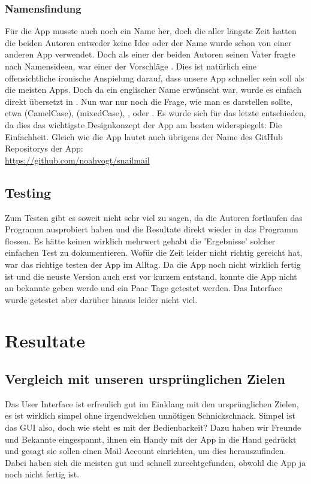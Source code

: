 \documentclass[a4paper,11pt]{article}
\begin{document}
\subsubsection{Namensfindung}
Für die App musste auch noch ein Name her, doch die aller längste Zeit hatten die beiden Autoren entweder keine Idee oder der Name wurde schon von einer anderen App verwendet. Doch als einer der beiden Autoren seinen Vater fragte nach Namensideen, war einer der Vorschläge . Dies ist natürlich eine offensichtliche ironische Anspielung darauf, dass unsere App schneller sein soll als die meisten Apps. Doch da ein englischer Name erwünscht war, wurde es einfach direkt übersetzt in . Nun war nur noch die Frage, wie man es darstellen sollte, etwa  (CamelCase),  (mixedCase), ,  oder . Es wurde sich für das letzte entschieden, da dies das wichtigste Designkonzept der App am besten widerspiegelt: Die Einfachheit. Gleich wie die App lautet auch übrigens der Name des GitHub Repositorys der App:\\

\url{https://github.com/noahvogt/snailmail}

\subsection{Testing}

Zum Testen gibt es soweit nicht sehr viel zu sagen, da die Autoren fortlaufen das Programm ausprobiert haben und die Resultate direkt wieder in das Programm flossen.
Es hätte keinen wirklich mehrwert gehabt die 'Ergebnisse' solcher einfachen Test zu dokumentieren. Wofür die Zeit leider nicht richtig gereicht hat, war das 
richtige testen der App im Alltag. Da die App noch nicht wirklich fertig ist und die neuste Version auch erst vor kurzem entstand, konnte die App nicht an bekannte geben werde
und ein Paar Tage getestet werden. Das Interface wurde getestet aber darüber hinaus leider nicht viel.

\section{Resultate}
\subsection{Vergleich mit unseren ursprünglichen Zielen}
Das User Interface ist erfreulich gut im Einklang mit den ursprünglichen Zielen, es ist wirklich simpel ohne irgendwelchen unnötigen Schnickschnack. Simpel ist das GUI also, doch wie steht es mit der Bedienbarkeit? Dazu haben wir Freunde und Bekannte eingespannt, ihnen ein Handy mit der App in die Hand gedrückt und gesagt sie sollen einen Mail Account einrichten, um dies herauszufinden. Dabei haben sich die meisten gut und schnell zurechtgefunden, obwohl die App ja noch nicht fertig ist.\\
\end{document}
